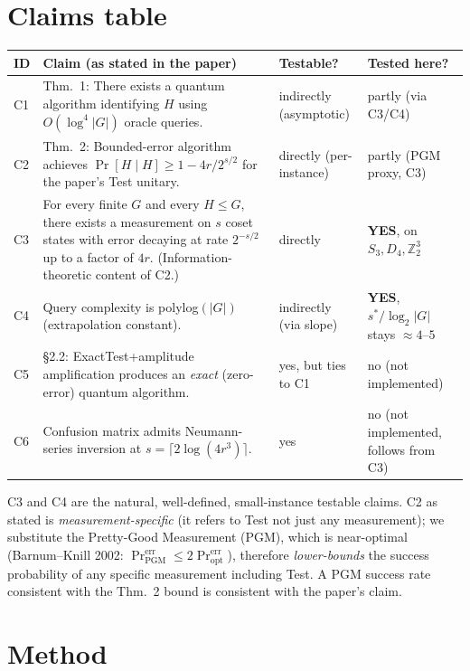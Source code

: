 \documentclass[11pt]{article}
\begin{document}
\section{Claims table}
\begin{center}\small
\begin{tabular}{@{}lp{8.0cm}ll@{}}
\toprule
ID & Claim (as stated in the paper) & Testable? & Tested here? \\
\midrule
C1 & Thm.~1: There exists a quantum algorithm identifying $H$ using
     $O(\log^{4}|G|)$ oracle queries.
   & indirectly (asymptotic) & partly (via C3/C4) \\
C2 & Thm.~2: Bounded-error algorithm achieves
     $\Pr[H\mid H]\ge 1 - 4r/2^{s/2}$ for the paper's \textsf{Test}
     unitary. & directly (per-instance) & partly (PGM proxy, C3) \\
C3 & For every finite $G$ and every $H\le G$, there exists a measurement on
     $s$ coset states with error decaying at rate $2^{-s/2}$ up to a factor of
     $4r$.  (Information-theoretic content of C2.) & directly
   & \textbf{YES}, on $S_3, D_4, \mathbb{Z}_2^{3}$ \\
C4 & Query complexity is polylog$(|G|)$ (extrapolation constant).
   & indirectly (via slope) & \textbf{YES}, $s^*/\log_2|G|$
     stays $\approx 4$--$5$ \\
C5 & \S2.2: \textsf{ExactTest}+amplitude amplification produces an
     \emph{exact} (zero-error) quantum algorithm.
   & yes, but ties to C1 & no (not implemented) \\
C6 & Confusion matrix admits Neumann-series inversion at
     $s = \lceil 2\log(4r^3)\rceil$.
   & yes & no (not implemented, follows from C3) \\
\bottomrule
\end{tabular}
\end{center}

C3 and C4 are the natural, well-defined, small-instance testable claims.
C2 as stated is \emph{measurement-specific} (it refers to \textsf{Test} not
just any measurement); we substitute the Pretty-Good Measurement (PGM), which
is near-optimal (Barnum--Knill 2002:
$\Pr_{\text{PGM}}^{\text{err}} \le 2\Pr_{\text{opt}}^{\text{err}}$),
therefore \emph{lower-bounds} the success probability of any specific
measurement including \textsf{Test}.  A PGM success rate consistent with the
Thm.~2 bound is consistent with the paper's claim.

\section{Method}
\end{document}
